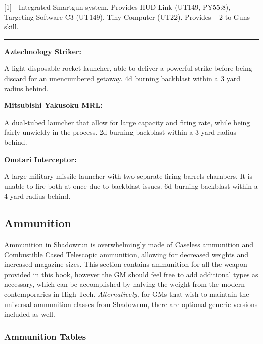 [1] - Integrated Smartgun system. Provides HUD Link (UT149, PY55:8), Targeting Software C3 (UT149), Tiny Computer (UT22). Provides +2 to Guns skill.

\par\rule{\textwidth}{0.5pt} 

\begin{mdframed}[linewidth=0pt]
\begin{multicols}{2}
	
	\textbf{Aztechnology Striker:}
	
	A light disposable rocket launcher, able to deliver a powerful strike before being discard for an unencumbered getaway. 4d burning backblast within a 3 yard radius behind.
	
	\textbf{Mitsubishi Yakusoku MRL:}
	
	A dual-tubed launcher that allow for large capacity and firing rate, while being fairly unwieldy in the process. 2d burning backblast within a 3 yard radius behind.
	
	\textbf{Onotari Interceptor:}
	
	A large military missile launcher with two separate firing barrels chambers. It is unable to fire both at once due to backblast issues. 6d burning backblast within a 4 yard radius behind.

\end{multicols}
\end{mdframed}

\subsection{Ammunition}

Ammunition in Shadowrun is overwhelmingly made of Caseless ammunition and Combustible Cased Telescopic ammunition, allowing for decreased weights and increased magazine sizes. This section contains ammunition for all the weapon provided in this book, however the GM should feel free to add additional types as necessary, which can be accomplished by halving the weight from the modern contemporaries in \GURPS High Tech. \textit{Alternatively,} for GMs that wish to maintain the universal ammunition classes from Shadowrun, there are optional generic versions included as well. \newline

\subsubsection{Ammunition Tables}

